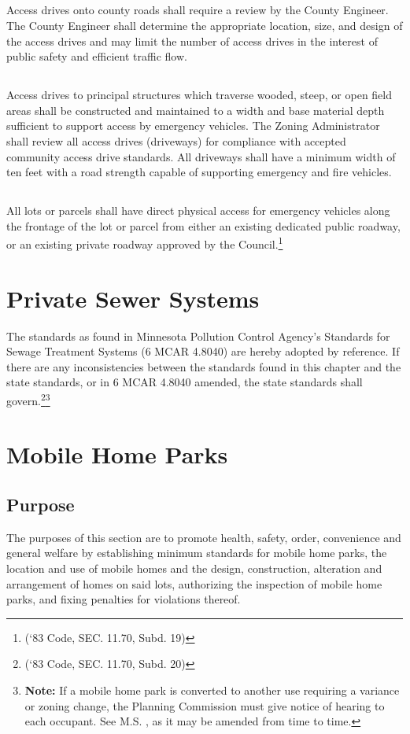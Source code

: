 \subsection{}
Access drives onto county roads shall require a review by the County Engineer.  The County Engineer shall determine the appropriate location, size, and design of the access drives and may limit the number of access drives in the interest of public safety and efficient traffic flow.
\subsection{}
Access drives to principal structures which traverse wooded, steep, or open field areas shall be constructed and maintained to a width and base material depth sufficient to support access by emergency vehicles. The Zoning Administrator shall review all access drives (driveways) for compliance with accepted community access drive standards. All driveways shall have a minimum width of ten feet with a road strength capable of supporting emergency and fire vehicles.
\subsection{}
All lots or parcels shall have direct physical access for emergency vehicles along the frontage of the lot or parcel from either an existing dedicated public roadway, or an existing private roadway approved by the Council.\footnote{(‘83 Code, SEC. 11.70, Subd. 19)}
\section{Private Sewer Systems}
The standards as found in Minnesota Pollution Control Agency’s Standards for Sewage Treatment Systems (6 MCAR 4.8040) are hereby adopted by reference. If there are any inconsistencies between the standards found in this chapter and the state standards, or in 6 MCAR 4.8040 amended, the state standards shall govern.\footnote{(‘83 Code, SEC. 11.70, Subd. 20)}\footnote{\textbf{Note:} If a mobile home park is converted to another use requiring a variance or zoning change, the Planning Commission must give notice of hearing to each occupant. See M.S. , as it may be amended from time to time.}\\
\section{Mobile Home Parks}
\subsection{Purpose}
The purposes of this section are to promote health, safety, order, convenience and general welfare by establishing minimum standards for mobile home parks, the location and use of mobile homes and the design, construction, alteration and arrangement of homes on said lots, authorizing the inspection of mobile home parks, and fixing penalties for violations thereof.
